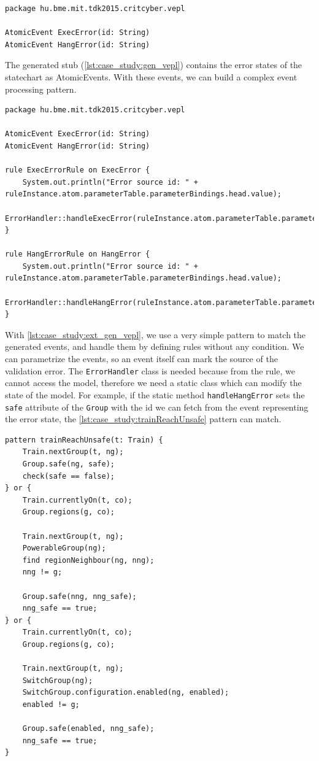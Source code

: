 \begin{lstlisting}[caption={Generated VEPL definition},label=lst:case_study:gen_vepl]
package hu.bme.mit.tdk2015.critcyber.vepl

AtomicEvent ExecError(id: String)
AtomicEvent HangError(id: String)
\end{lstlisting}

\nohyphenation The generated stub (\cref{lst:case_study:gen_vepl}) contains the error states of the statechart as AtomicEvents. With these events, we can build a complex event processing pattern.
\\[1ex]

\begin{lstlisting}[caption={Extended VEPL definition},label=lst:case_study:ext_gen_vepl]
package hu.bme.mit.tdk2015.critcyber.vepl

AtomicEvent ExecError(id: String)
AtomicEvent HangError(id: String)

rule ExecErrorRule on ExecError {
	System.out.println("Error source id: " + ruleInstance.atom.parameterTable.parameterBindings.head.value);
	ErrorHandler::handleExecError(ruleInstance.atom.parameterTable.parameterBindings.head.value)
}

rule HangErrorRule on HangError {
	System.out.println("Error source id: " + ruleInstance.atom.parameterTable.parameterBindings.head.value);
	ErrorHandler::handleHangError(ruleInstance.atom.parameterTable.parameterBindings.head.value)
}
\end{lstlisting}

With \cref{lst:case_study:ext_gen_vepl}, we use a very simple pattern to match the generated events, and handle them by defining rules without any condition. We can parametrize the events, so an event itself can mark the source of the validation error. The \verb+ErrorHandler+ class is needed because from the rule, we cannot access the model, therefore we need a static class which can modify the state of the model. For example, if the static method \verb+handleHangError+ sets the \verb+safe+ attribute of the \verb+Group+ with the id we can fetch from the event representing the error state, the \cref{lst:case_study:trainReachUnsafe} pattern can match.

\newpage
\begin{lstlisting}[caption={Collision detection},label=lst:case_study:trainReachUnsafe]
pattern trainReachUnsafe(t: Train) {
	Train.nextGroup(t, ng);
	Group.safe(ng, safe);
	check(safe == false);
} or {
	Train.currentlyOn(t, co);
	Group.regions(g, co);
	
	Train.nextGroup(t, ng);
	PowerableGroup(ng);
	find regionNeighbour(ng, nng);
	nng != g;
	
	Group.safe(nng, nng_safe);
	nng_safe == true;
} or {
	Train.currentlyOn(t, co);
	Group.regions(g, co);
	
	Train.nextGroup(t, ng);
	SwitchGroup(ng);
	SwitchGroup.configuration.enabled(ng, enabled);
	enabled != g;
	
	Group.safe(enabled, nng_safe);
	nng_safe == true;
}
\end{lstlisting}

